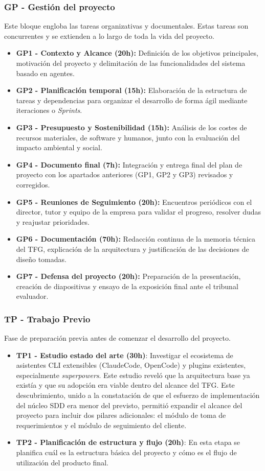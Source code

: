 \documentclass[11pt, letterpaper]{article}
\begin{document}
\subsubsection{GP - Gestión del proyecto}
\label{sec:gp}
Este bloque engloba las tareas organizativas y documentales. Estas tareas son concurrentes y se extienden a lo largo de toda la vida del proyecto.
\begin{itemize}
    \item \textbf{GP1 - Contexto y Alcance (20h):} Definición de los objetivos principales, motivación del proyecto y delimitación de las funcionalidades del sistema basado en agentes.
    \item \textbf{GP2 - Planificación temporal (15h):} Elaboración de la estructura de tareas y dependencias para organizar el desarrollo de forma ágil mediante iteraciones o \textit{Sprints}.
    \item \textbf{GP3 - Presupuesto y Sostenibilidad (15h):} Análisis de los costes de recursos materiales, de software y humanos, junto con la evaluación del impacto ambiental y social.
    \item \textbf{GP4 - Documento final (7h):} Integración y entrega final del plan de proyecto con los apartados anteriores (GP1, GP2 y GP3) revisados y corregidos. 
    \item \textbf{GP5 - Reuniones de Seguimiento (20h):} Encuentros periódicos con el director, tutor y equipo de la empresa para validar el progreso, resolver dudas y reajustar prioridades.
    \item \textbf{GP6 - Documentación (70h):} Redacción continua de la memoria técnica del TFG, explicación de la arquitectura y justificación de las decisiones de diseño tomadas.
    \item \textbf{GP7 - Defensa del proyecto (20h):} Preparación de la presentación, creación de diapositivas y ensayo de la exposición final ante el tribunal evaluador.
\end{itemize}
\newpage
\subsubsection{TP - Trabajo Previo}
\label{sec:tp}
Fase de preparación previa antes de comenzar el desarrollo del proyecto.
\begin{itemize}
    \item \textbf{TP1 - Estudio estado del arte (30h)}: Investigar el ecosistema de asistentes CLI extensibles (ClaudeCode, OpenCode) y plugins existentes, especialmente \textit{superpowers}. Este estudio reveló que la arquitectura base ya existía y que su adopción era viable dentro del alcance del TFG. Este descubrimiento, unido a la constatación de que el esfuerzo de implementación del núcleo SDD era menor del previsto, permitió expandir el alcance del proyecto para incluir dos pilares adicionales: el módulo de toma de requerimientos y el módulo de seguimiento del cliente.
    \item \textbf{TP2 - Planificación de estructura y flujo (20h)}: En esta etapa se planifica cuál es la estructura básica del proyecto y cómo es el flujo de utilización del producto final.
\end{itemize}
\end{document}
